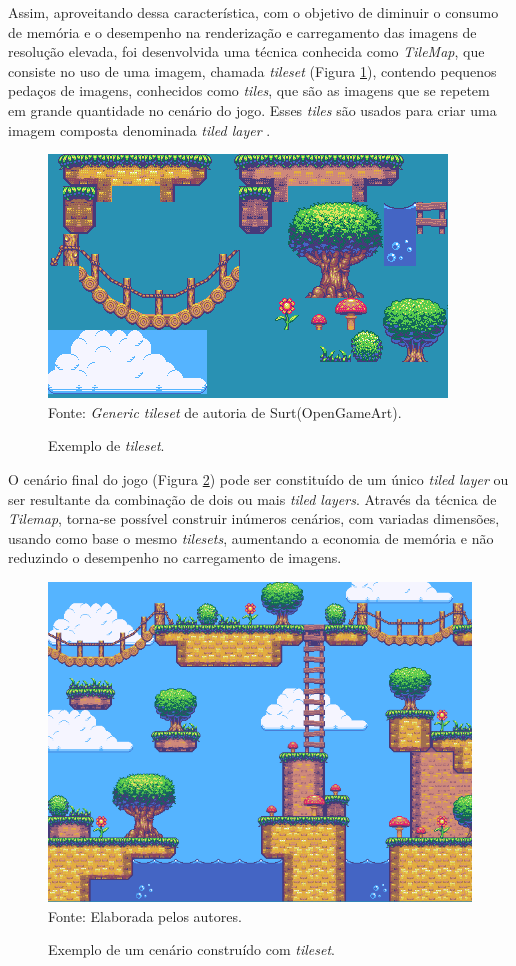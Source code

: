 Assim, aproveitando dessa característica, com o objetivo de diminuir o consumo de memória e o desempenho na renderização e carregamento das imagens de resolução elevada, foi desenvolvida uma técnica conhecida como \textit{TileMap}, que consiste no uso de uma imagem, chamada \textit{tileset} (Figura \ref{tileset_edit}), contendo pequenos pedaços de imagens, conhecidos como \textit{tiles}, que são as imagens que se repetem em grande quantidade no cenário do jogo. Esses \textit{tiles} são usados para criar uma imagem composta denominada \textit{tiled layer} \cite{Novak}.
%
%
\begin{figure}[H]
    \centering
    \caption{Exemplo de \textit{tileset}.}
    \label{tileset_edit}
    \includegraphics[scale = 1.0]{Imagens/tileset_edit.png}
    \\Fonte: \textit{Generic tileset} de autoria de Surt(OpenGameArt).
\end{figure}
%
\par
O cenário final do jogo (Figura \ref{cenario}) pode ser constituído de um único \textit{tiled layer} ou ser resultante da combinação de dois ou mais \textit{tiled layers}. Através da técnica de \textit{Tilemap}, torna-se possível construir inúmeros cenários, com variadas dimensões, usando como base o mesmo \textit{tilesets}, aumentando a economia de memória e não reduzindo o desempenho no carregamento de imagens.
%
%
%
\begin{figure}[H]
    \centering
    \caption{Exemplo de um cenário construído com \textit{tileset}.}
    \label{cenario}
    \includegraphics[scale = 0.65]{Imagens/cenario.png}
    \\Fonte: Elaborada pelos autores.
\end{figure}
